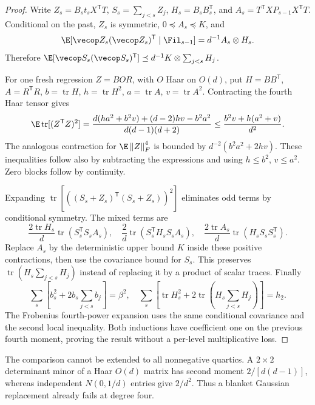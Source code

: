 \documentclass[11pt,oneside,openany,a4paper]{book}
\numberwithin{equation}{chapter}
\theoremstyle{definition}
\theoremstyle{remark}
\newcommand{\T}{\mathsf T}\newcommand{\Id}{I}
\newcommand{\F}[1]{\left\lVert#1\right\rVert_F}
\DeclareMathOperator{\tr}{tr}\DeclareMathOperator{\rank}{rank}
\begin{document}
\begin{proof}
Write $Z_s=B_st_sX^\T T$, $S_s=\sum_{j<s}Z_j$,
$H_s=B_sB_s^\T$, and
$A_s=T^\T XP_{s-1}X^\T T$. Conditional on the past, $Z_s$ is symmetric,
$0\preceq A_s\preceq K$, and
\[
 \E[\vecop Z_s(\vecop Z_s)^\T\mid\Fil_{s-1}]
 =d^{-1}A_s\otimes H_s.
\]
Therefore
$\E[\vecop S_s(\vecop S_s)^\T]\preceq
 d^{-1}K\otimes\sum_{j<s}H_j$.

For one fresh regression $Z=BOR$, with $O$ Haar on $O(d)$, put
$H=BB^\T$, $A=R^\T R$, $b=\tr H$, $h=\tr H^2$, $a=\tr A$, $v=\tr A^2$. Contracting the fourth Haar tensor gives
\[
 \E\tr[(Z^\T Z)^2]
 =\frac{d(ha^2+b^2v)+(d-2)hv-b^2a^2}{d(d-1)(d+2)}
 \le\frac{b^2v+h(a^2+v)}{d^2}.
\]
The analogous contraction for $\E\F Z^4$ is bounded by
$d^{-2}(b^2a^2+2hv)$. These inequalities follow also by subtracting the expressions and using $h\le b^2$, $v\le a^2$. Zero blocks follow by continuity.

Expanding $\tr[((S_s+Z_s)^\T(S_s+Z_s))^2]$ eliminates odd terms by conditional symmetry. The mixed terms are
\[
 \frac{2\tr H_s}{d}\tr(S_s^\T S_sA_s),\quad
 \frac2d\tr(S_s^\T H_sS_sA_s),\quad
 \frac{2\tr A_s}{d}\tr(H_sS_sS_s^\T).
\]
Replace $A_s$ by the deterministic upper bound $K$ inside these positive contractions, then use the covariance bound for $S_s$. This preserves $\tr(H_s\sum_{j<s}H_j)$ instead of replacing it by a product of scalar traces. Finally
\[
 \sum_s[b_s^2+2b_s\sum_{j<s}b_j]=\beta^2,
 \quad
 \sum_s[\tr H_s^2+2\tr(H_s\sum_{j<s}H_j)]=h_2.
\]
The Frobenius fourth-power expansion uses the same conditional covariance and the second local inequality. Both inductions have coefficient one on the previous fourth moment, proving the result without a per-level multiplicative loss.
\end{proof}

The comparison cannot be extended to all nonnegative quartics. A $2\times2$ determinant minor of a Haar $O(d)$ matrix has second moment $2/[d(d-1)]$, whereas independent $N(0,1/d)$ entries give $2/d^2$. Thus a blanket Gaussian replacement already fails at degree four.
\end{document}
